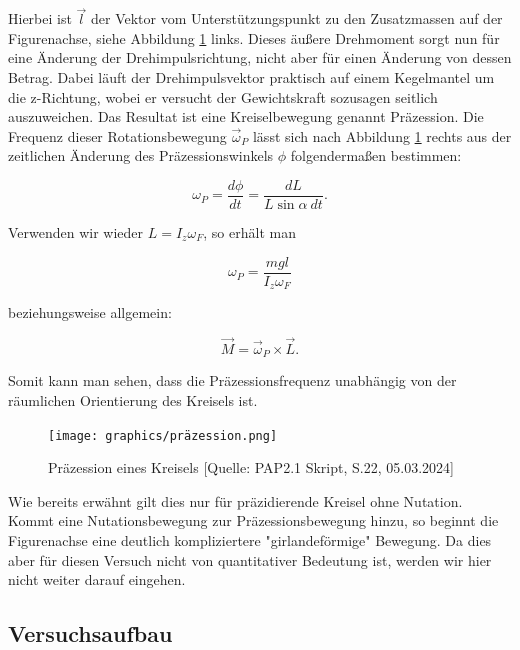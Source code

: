 \documentclass{article}
\begin{document}
Hierbei ist $\Vec{l}$ der Vektor vom Unterstützungspunkt zu den Zusatzmassen auf der Figurenachse, siehe Abbildung \ref{fig:präzession} links. Dieses äußere Drehmoment sorgt nun für eine Änderung der Drehimpulsrichtung, nicht aber für einen Änderung von dessen Betrag. Dabei läuft der Drehimpulsvektor praktisch auf einem Kegelmantel um die z-Richtung, wobei er versucht der Gewichtskraft sozusagen seitlich auszuweichen. Das Resultat ist eine Kreiselbewegung genannt Präzession. Die Frequenz dieser Rotationsbewegung $\Vec{\omega}_P$ lässt sich nach Abbildung \ref{fig:präzession} rechts aus der zeitlichen Änderung des Präzessionswinkels $\phi$ folgendermaßen bestimmen:

\begin{equation}
        \omega_P = \frac{d \phi}{dt} = \frac{dL}{L \sin{\alpha} \ dt}.
\end{equation}

Verwenden wir wieder $L = I_z \omega_F$, so erhält man

\begin{equation}
        \omega_P = \frac{mgl}{I_z \omega_F}
        \label{eq:omegaP_omegaF}
\end{equation}

beziehungsweise allgemein:

\begin{equation}
     \Vec{M} = \Vec{\omega}_P \times \Vec{L}.
\end{equation}

Somit kann man sehen, dass die Präzessionsfrequenz unabhängig von der räumlichen Orientierung des Kreisels ist.

\phantom{.}

\begin{figure}[!h]
    \centering
    \texttt{[image: graphics/präzession.png]}
    \caption{Präzession eines Kreisels [Quelle: PAP2.1 Skript, S.22, 05.03.2024]}
    \label{fig:präzession}
\end{figure}

\phantom{.}

Wie bereits erwähnt gilt dies nur für präzidierende Kreisel ohne Nutation. Kommt eine Nutationsbewegung zur Präzessionsbewegung hinzu, so beginnt die Figurenachse eine deutlich kompliziertere "girlandeförmige" Bewegung. Da dies aber für diesen Versuch nicht von quantitativer Bedeutung ist, werden wir hier nicht weiter darauf eingehen.

\newpage
\subsection{Versuchsaufbau}
\end{document}
